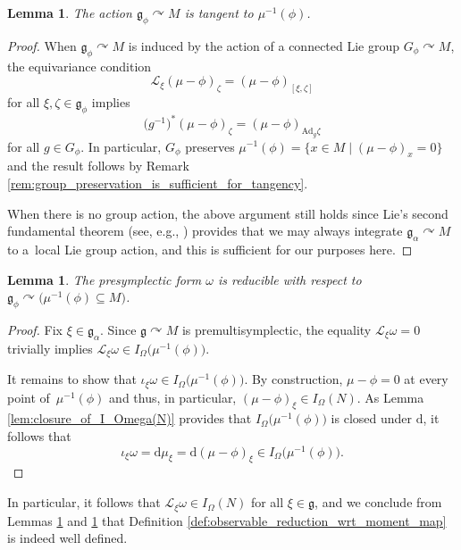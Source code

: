 \documentclass[10pt,a4paper]{amsart}
\numberwithin{equation}{section}
\newtheorem{Lemma}[Theorem]{Lemma}
\newcommand{\g}{\mathfrak{g}}
\renewcommand{\L}{\mathscr{L}}
\newcommand{\Ad}{\mathrm{Ad}}
\renewcommand{\subset}{\subseteq}
\renewcommand{\d}{\mathrm{d}}
\begin{document}
\begin{Lemma}\label{lem:isotropy_action_is_tangent_to_phi_level_set}
	The action $\g_\phi\curvearrowright M$ is tangent to $\mu^{-1}(\phi)$.
\end{Lemma}

\begin{proof}
	When $\g_\phi\curvearrowright M$ is induced by the action of a connected Lie group $G_\phi\curvearrowright M$, the equivariance condition
	\[
		\L_\xi(\mu-\phi)_\zeta = (\mu-\phi)_{[\xi,\zeta]}
	\]
	for all $\xi,\zeta\in\g_\phi$ implies
	\[
		\bigl(g^{-1}\bigr)^*(\mu-\phi)_\zeta = (\mu-\phi)_{\Ad_g\zeta}
	\]
	for all $g\in G_\phi$. In particular, $G_\phi$ preserves $\mu^{-1}(\phi)=\{x\in M\mid (\mu-\phi)_x = 0\}$ and the result follows by Remark \ref{rem:group_preservation_is_sufficient_for_tangency}.

	When there is no group action, the above argument still holds since Lie's second fundamental theorem (see, e.g., \cite[Theorem~20.22]{Lee12}) provides that we may always integrate $\g_\alpha\curvearrowright M$ to a~local Lie group action, and this is sufficient for our purposes here.
\end{proof}

\begin{Lemma}\label{lem:omega_is_reducible_over_phi_level_set}
	The presymplectic form $\omega$ is reducible with respect to $\g_\phi\curvearrowright\bigl(\mu^{-1}(\phi)\subset M\bigr)$.
\end{Lemma}

\begin{proof}
	Fix $\xi\in\g_\alpha$. Since $\g\curvearrowright M$ is premultisymplectic, the equality $\L_\xi\omega=0$ trivially implies $\L_\xi\omega\in I_\Omega\bigl(\mu^{-1}(\phi)\bigr)$.

	It remains to show that $\iota_\xi\omega\in I_\Omega\bigl(\mu^{-1}(\phi)\bigr)$. By construction, $\mu-\phi=0$ at every point of~$\mu^{-1}(\phi)$ and thus, in particular, $(\mu-\phi)_\xi\in I_\Omega(N)$. As Lemma \ref{lem:closure_of_I_Omega(N)} provides that $I_\Omega\bigl(\mu^{-1}(\phi)\bigr)$ is closed under $\d$, it follows that
	\[
		\iota_\xi\omega = \d\mu_\xi = \d(\mu-\phi)_\xi \in I_\Omega\bigl(\mu^{-1}(\phi)\bigr).
\tag*{\qed}
\]
\renewcommand{\qed}{}
\end{proof}

In particular, it follows that $\L_\xi\omega\in I_\Omega(N)$ for all $\xi\in\g$, and we conclude from Lemmas \ref{lem:isotropy_action_is_tangent_to_phi_level_set} and \ref{lem:omega_is_reducible_over_phi_level_set} that Definition \ref{def:observable_reduction_wrt_moment_map} is indeed well defined.
\end{document}
